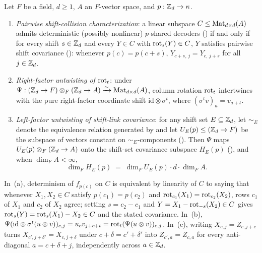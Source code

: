 \begin{theorem}\label{thm:anti-diagonal}
Let $F$ be a field, $d \ge 1$, $A$ an $F$-vector space, and $p : \mathbb{Z}_d \to \kappa$.
\begin{enumerate}[label=(\alph*)]
\item \emph{Pairwise shift-collision characterization}: a linear subspace $C \le \operatorname{Mat}_{d\times d}(A)$
  admits deterministic (possibly nonlinear) $p$-shared decoders ()
  if and only if for every shift $s \in \mathbb{Z}_d$ and every $Y \in C$ with $\operatorname{rot}_s(Y) \in C$, $Y$
  satisfies pairwise shift covariance (): whenever
  $p(c) = p(c+s)$, $Y_{c+s,\,j} = Y_{c,\,j+s}$ for all $j \in \mathbb{Z}_d$.
\item \emph{Right-factor untwisting of $\operatorname{rot}_t$}: under $\Psi : (\mathbb{Z}_d \to F) \otimes_F (\mathbb{Z}_d \to A)
  \xrightarrow{\sim} \operatorname{Mat}_{d\times d}(A)$, column rotation $\operatorname{rot}_t$ intertwines with the pure
  right-factor coordinate shift $\mathrm{id} \otimes \sigma^t$, where $(\sigma^t v)_a = v_{a+t}$.
\item \emph{Left-factor untwisting of shift-link covariance}: for any shift set $E \subseteq \mathbb{Z}_d$,
  let $\sim_E$ denote the equivalence relation generated by  and let
  $U_E(p) \le (\mathbb{Z}_d \to F)$ be the subspace of vectors constant on $\sim_E$-components
  (). Then $\Psi$ maps $U_E(p) \otimes_F (\mathbb{Z}_d \to A)$ onto the
  shift-set covariance subspace $H_E(p)$ (), and when
  $\dim_F A < \infty$,
  \[
    \dim_F H_E(p) \;=\; \dim_F U_E(p) \cdot d \cdot \dim_F A.
  \]
\end{enumerate}
\end{theorem}
\begin{outline}
In~(a), determinism of $f_{p(c)}$ on $C$ is equivalent by linearity of $C$ to saying that whenever
$X_1, X_2 \in C$ satisfy $p(c_1) = p(c_2)$ and $\operatorname{rot}_{c_1}(X_1) = \operatorname{rot}_{c_2}(X_2)$, rows $c_1$ of
$X_1$ and $c_2$ of $X_2$ agree; setting $s = c_2 - c_1$ and $Y = X_1 - \operatorname{rot}_{-s}(X_2) \in C$ gives
$\operatorname{rot}_s(Y) = \operatorname{rot}_s(X_1) - X_2 \in C$ and the stated covariance. In~(b),
$\Psi(\mathrm{id}\otimes \sigma^t(u \otimes v))_{c,j} = u_c v_{j+c+t} = \operatorname{rot}_t(\Psi(u\otimes v))_{c,j}$.
In~(c), writing $X_{c,j} = Z_{c, j+c}$ turns $X_{c', j+\delta'} = X_{c, j+\delta}$ under
$c + \delta = c' + \delta'$ into $Z_{c', a} = Z_{c, a}$ for every anti-diagonal $a = c + \delta + j$,
independently across $a \in \mathbb{Z}_d$.
\end{outline}

